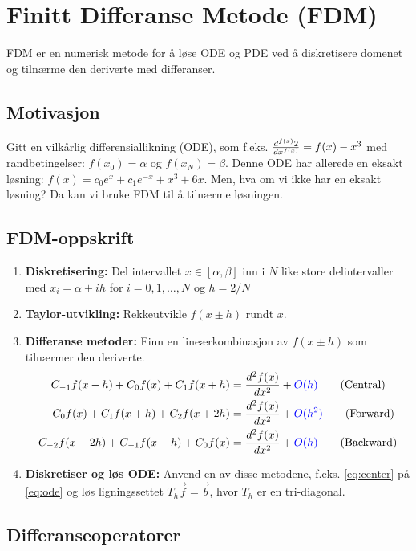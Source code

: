 \chapter{Finitt Differanse Metode (FDM)}
FDM er en numerisk metode for å løse ODE og PDE ved å diskretisere domenet og tilnærme den deriverte med differanser.
\section{Motivasjon}
Gitt en vilkårlig differensiallikning (ODE), som f.eks. \( \ddn[2]{f(x)}{x} = f(x) - x^3 \)\label{eq:ode} med randbetingelser: \( f(x_0) = \alpha \) og \( f(x_N) = \beta \).
Denne ODE har allerede en eksakt løsning: \( f(x) = c_0e^x + c_1e^{-x} + x^3 + 6x \)\label{eq:exact}.
Men, hva om vi ikke har en eksakt løsning? Da kan vi bruke FDM til å tilnærme løsningen.

\section{FDM-oppskrift}
\begin{enumerate}
  \item \textbf{Diskretisering:} Del intervallet \(x \in [\alpha, \beta]\) inn i \(N\) like store delintervaller med \(x_i = \alpha + ih\) for \(i = 0,1,\ldots,N\) og \(h = 2/N\)
  \item \textbf{Taylor-utvikling:} Rekkeutvikle \(f(x \pm h)\) rundt \(x\).
  \item \textbf{Differanse metoder:} Finn en lineærkombinasjon av \(f(x \pm h)\) som tilnærmer den deriverte.
        \begin{align}
          C_{-1}f(x - h) + C_0f(x) + C_1f(x + h)   & = \ddn[f(x)]{2}{x} + \mathcolor{blue}{O(h)} \tag{Central} \label{eq:center}    \\
          C_{0}f(x) + C_1f(x + h ) + C_2f(x + 2h)  & = \ddn[f(x)]{2}{x} + \mathcolor{blue}{O(h^2)} \tag{Forward} \label{eq:forward} \\
          C_{-2}f(x - 2h) + C_{-1}f(x-h) + C_0f(x) & = \ddn[f(x)]{2}{x} + \mathcolor{blue}{O(h)} \tag{Backward} \label{eq:backward}
        \end{align}
  \item \textbf{Diskretiser og løs ODE:} Anvend en av disse metodene, f.eks. \ref{eq:center} på \ref{eq:ode} og løs ligningssettet \(T_h \vec{f} = \vec{b}\), hvor \(T_h\) er en tri-diagonal.
\end{enumerate}
\section*{Differanseoperatorer}

